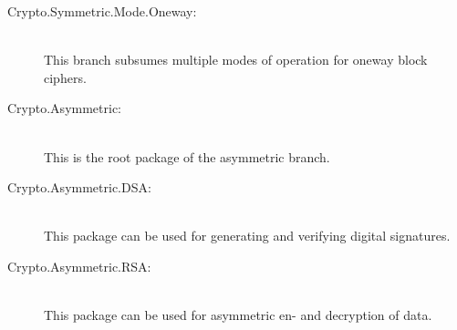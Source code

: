 \begin{description}
\item[Crypto.Symmetric.Mode.Oneway:]\ \\
  This branch subsumes multiple modes of operation for oneway block ciphers.
\item[Crypto.Asymmetric:]\ \\
  This is the root package of the asymmetric branch.
\item[Crypto.Asymmetric.DSA:]\ \\
  This package can be used for generating and verifying digital signatures.
\item[Crypto.Asymmetric.RSA:]\ \\
  This package can be used for asymmetric en- and decryption of data.
\end{description}


\begin{figure}
\end{figure}
    
